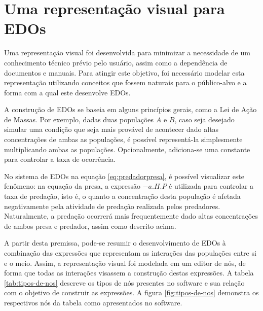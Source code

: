 \documentclass[
	12pt,				%
	openright,			%
	oneside,			%
	a4paper,			%
	main=brazil,
	english,			%
	]{ufsj-abntex2}
\begin{document}
\section{Uma representação visual para EDOs}
\label{sec:representacao-visual-edo}

Uma representação visual foi desenvolvida para minimizar a necessidade de um conhecimento técnico prévio pelo usuário, assim como a dependência de documentos e manuais. Para atingir este objetivo, foi necessário modelar esta representação utilizando conceitos que fossem naturais para o público-alvo e a forma com a qual este desenvolve EDOs.

A construção de EDOs se baseia em alguns princípios gerais, como a Lei de Ação de Massas. Por exemplo, dadas duas populações $A$ e $B$, caso seja desejado simular uma condição que seja mais provável de acontecer dado altas concentrações de ambas as populações, é possível representá-la simplesmente multiplicando ambas as populações. Opcionalmente, adiciona-se uma constante para controlar a taxa de ocorrência.

No sistema de EDOs na equação \ref{eq:predadorpresa}, é possível visualizar este fenômeno: na equação da presa, a expressão \(-a.H.P\) é utilizada para controlar a taxa de predação, isto é, o quanto a concentração desta população é afetada negativamente pela atividade de predação realizada pelos predadores. Naturalmente, a predação ocorrerá mais frequentemente dado altas concentrações de ambos presa e predador, assim como descrito acima.

A partir desta premissa, pode-se resumir o desenvolvimento de EDOs à combinação das expressões que representam as interações das populações entre si e o meio. Assim, a representação visual foi modelada em um editor de nós, de forma que todas as interações visassem a construção destas expressões. A tabela \ref{tab:tipos-de-nos} descreve os tipos de nós presentes no software e sua relação com o objetivo de construir as expressões. A figura \ref{fig:tipos-de-nos} demonstra os respectivos nós da tabela como apresentados no software.
\end{document}
